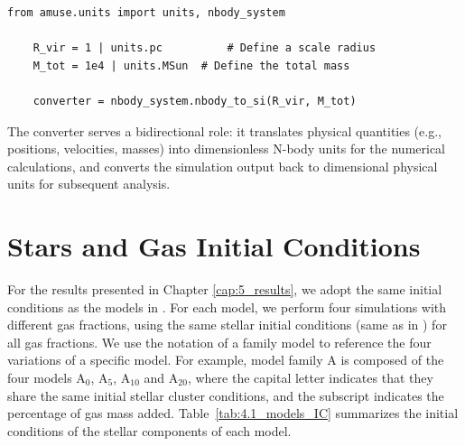 \begin{lstlisting}[caption=How to define a converter in AMUSE, label=lst:create_converter]
	from amuse.units import units, nbody_system
	
	R_vir = 1 | units.pc          # Define a scale radius
	M_tot = 1e4 | units.MSun  # Define the total mass
	
	converter = nbody_system.nbody_to_si(R_vir, M_tot)
\end{lstlisting}

The converter serves a bidirectional role: it translates physical quantities (e.g., positions, velocities, masses) into dimensionless N-body units for the numerical calculations, and converts the simulation output back to dimensional physical units for subsequent analysis.

\section{Stars and Gas Initial Conditions}
\label{sec:4.2_stars_gas_IC}

For the results presented in Chapter \ref{cap:5_results}, we adopt the same initial conditions as the models in \citet{vergara2023global}. For each model, we perform four simulations with different gas fractions, using the same stellar initial conditions (same as in \citet{vergara2023global}) for all gas fractions. We use the notation of a family model to reference the four variations of a specific model. For example, model family A is composed of the four models A$_0$, A$_5$, A$_{10}$ and A$_{20}$, where the capital letter indicates that they share the same initial stellar cluster conditions, and the subscript indicates the percentage of gas mass added. Table~\ref{tab:4.1_models_IC} summarizes the initial conditions of the stellar components of each model.

